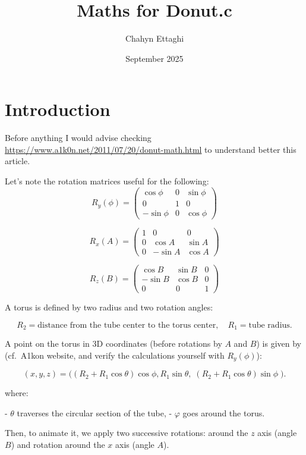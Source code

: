\documentclass{article}
\title{Maths for Donut.c}
\author{Chahyn Ettaghi}
\date{September 2025}
\begin{document}
\maketitle

\section{Introduction}
Before anything I would advise checking \underline{https://www.a1k0n.net/2011/07/20/donut-math.html} to understand better this article.

Let's note the rotation matrices useful for the following: 
\[
R_y(\phi) =
\begin{pmatrix}
\cos\phi & 0 & \sin\phi \\
0 & 1 & 0 \\
-\sin\phi & 0 & \cos\phi
\end{pmatrix}
\]

\[
R_x(A) =
\begin{pmatrix}
1 & 0 & 0 \\
0 & \cos A & \sin A \\
0 & -\sin A & \cos A
\end{pmatrix}
\]

\[
R_z(B) =
\begin{pmatrix}
\cos B & \sin B & 0 \\
-\sin B & \cos B & 0 \\
0 & 0 & 1
\end{pmatrix}
\]

A torus is defined by two radius and two rotation angles: 

\[
R_2 = \text{distance from the tube center to the torus center}, \quad
R_1 = \text{tube radius}.
\]

A point on the torus in 3D coordinates (before rotations by $A$ and $B$) is given by (cf.\ A1kon website, and verify the calculations yourself with $R_y(\phi)$):


\[
(x,y,z) =
\bigl((R_2 + R_1 \cos \theta)\cos \phi, R_1 \sin \theta,\; 
(R_2 + R_1 \cos \theta)\sin \phi \; 
 \bigr).
\]

where:  

- $\theta$ traverses the circular section of the tube,  
- $\varphi$ goes around the torus.  

\medskip

Then, to animate it, we apply two successive rotations: around the $z$ axis (angle $B$) and rotation around the $x$ axis (angle $A$).  
\end{document}

